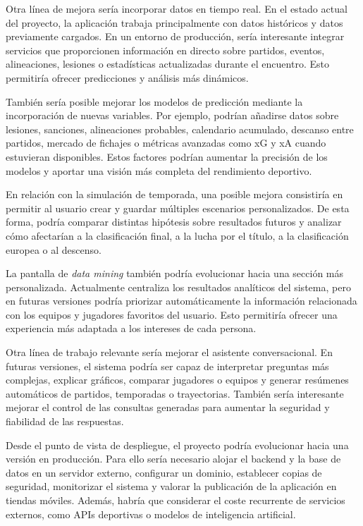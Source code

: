Otra línea de mejora sería incorporar datos en tiempo real. En el estado actual del proyecto, la aplicación trabaja principalmente con datos históricos y datos previamente cargados. En un entorno de producción, sería interesante integrar servicios que proporcionen información en directo sobre partidos, eventos, alineaciones, lesiones o estadísticas actualizadas durante el encuentro. Esto permitiría ofrecer predicciones y análisis más dinámicos.

También sería posible mejorar los modelos de predicción mediante la incorporación de nuevas variables. Por ejemplo, podrían añadirse datos sobre lesiones, sanciones, alineaciones probables, calendario acumulado, descanso entre partidos, mercado de fichajes o métricas avanzadas como xG y xA cuando estuvieran disponibles. Estos factores podrían aumentar la precisión de los modelos y aportar una visión más completa del rendimiento deportivo.

En relación con la simulación de temporada, una posible mejora consistiría en permitir al usuario crear y guardar múltiples escenarios personalizados. De esta forma, podría comparar distintas hipótesis sobre resultados futuros y analizar cómo afectarían a la clasificación final, a la lucha por el título, a la clasificación europea o al descenso.

La pantalla de \textit{data mining} también podría evolucionar hacia una sección más personalizada. Actualmente centraliza los resultados analíticos del sistema, pero en futuras versiones podría priorizar automáticamente la información relacionada con los equipos y jugadores favoritos del usuario. Esto permitiría ofrecer una experiencia más adaptada a los intereses de cada persona.

Otra línea de trabajo relevante sería mejorar el asistente conversacional. En futuras versiones, el sistema podría ser capaz de interpretar preguntas más complejas, explicar gráficos, comparar jugadores o equipos y generar resúmenes automáticos de partidos, temporadas o trayectorias. También sería interesante mejorar el control de las consultas generadas para aumentar la seguridad y fiabilidad de las respuestas.

Desde el punto de vista de despliegue, el proyecto podría evolucionar hacia una versión en producción. Para ello sería necesario alojar el backend y la base de datos en un servidor externo, configurar un dominio, establecer copias de seguridad, monitorizar el sistema y valorar la publicación de la aplicación en tiendas móviles. Además, habría que considerar el coste recurrente de servicios externos, como APIs deportivas o modelos de inteligencia artificial.

